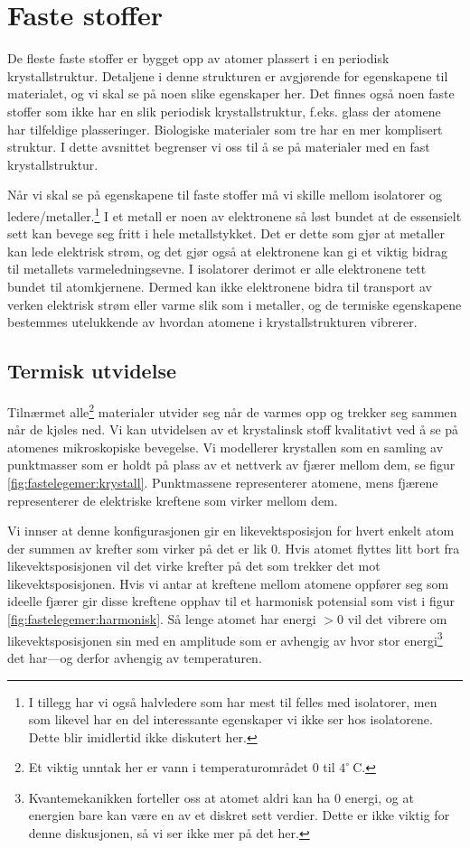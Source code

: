 \chapter{Faste stoffer}
De fleste faste stoffer er bygget opp av atomer plassert i en periodisk krystallstruktur. Detaljene i denne strukturen er avgjørende for egenskapene til materialet, og vi skal se på noen slike egenskaper her. Det finnes også noen faste stoffer som ikke har en slik periodisk krystallstruktur, f.eks. glass der atomene har tilfeldige plasseringer. Biologiske materialer som tre har en mer komplisert struktur. I dette avsnittet begrenser vi oss til å se på materialer med en fast krystallstruktur.

Når vi skal se på egenskapene til faste stoffer må vi skille mellom isolatorer og ledere/metaller.\footnote{I tillegg har vi også halvledere som har mest til felles med isolatorer, men som likevel har en del interessante egenskaper vi ikke ser hos isolatorene. Dette blir imidlertid ikke diskutert her.} I et metall er noen av elektronene så løst bundet at de essensielt sett kan bevege seg fritt i hele metallstykket. Det er dette som gjør at metaller kan lede elektrisk strøm, og det gjør også at elektronene kan gi et viktig bidrag til metallets varmeledningsevne. I isolatorer derimot er alle elektronene tett bundet til atomkjernene. Dermed kan ikke elektronene bidra til transport av verken elektrisk strøm eller varme slik som i metaller, og de termiske egenskapene bestemmes utelukkende av hvordan atomene i krystallstrukturen vibrerer.

\section{Termisk utvidelse}
Tilnærmet alle\footnote{Et viktig unntak her er vann i temperaturområdet 0 til $4^\circ~\mathrm{C}$.} materialer utvider seg når de varmes opp og trekker seg sammen når de kjøles ned. Vi kan  utvidelsen av et krystalinsk stoff kvalitativt ved å se på atomenes mikroskopiske bevegelse. Vi modellerer krystallen som en samling av punktmasser som er holdt på plass av et nettverk av fjærer mellom dem, se figur \ref{fig:fastelegemer:krystall}. Punktmassene representerer atomene, mens fjærene representerer de elektriske kreftene som virker mellom dem. 

Vi innser at denne konfigurasjonen gir en likevektsposisjon for hvert enkelt atom der summen av krefter som virker på det er lik 0. Hvis atomet flyttes litt bort fra likevektsposisjonen vil det virke krefter på det som trekker det mot likevektsposisjonen. Hvis vi antar at kreftene mellom atomene oppfører seg som ideelle fjærer gir disse kreftene opphav til et harmonisk potensial som vist i figur \ref{fig:fastelegemer:harmonisk}. Så lenge atomet har energi $> 0$ vil det vibrere om likevektsposisjonen sin med en amplitude som er avhengig av hvor stor energi\footnote{Kvantemekanikken forteller oss at atomet aldri kan ha 0 energi, og at energien bare kan være en av et diskret sett verdier. Dette er ikke viktig for denne diskusjonen, så vi ser ikke mer på det her.} det har---og derfor avhengig av temperaturen. 

